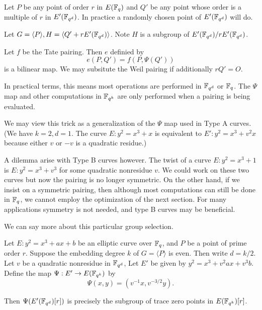 Let $P$ be any point of order $r$ in $E(\mathbb{F}_q)$ and
$Q'$ be any point whose order is a multiple of $r$ in $E'(\mathbb{F}_{q^d})$.
In practice a randomly chosen point of $E'(\mathbb{F}_{q^d})$ will do.

Let $G = \langle P \rangle, H = \langle Q' + r E'(\mathbb{F}_{q^d}) \rangle$.
Note $H$ is a subgroup of $E'(\mathbb{F}_{q^d}) / rE'(\mathbb{F}_{q^d})$.

Let $f$ be the Tate pairing.
Then $e$ definied by
\[e(P,Q') = f(P, \Psi(Q')) \]
is a bilinear map.
We may subsitute the Weil pairing if additionally
$r Q' = O$.

In practical terms, this means most operations are performed in
$\mathbb{F}_{q^d}$  or $\mathbb{F}_q$. The $\Psi$ map and
other computations in $\mathbb{F}_{q^k}$ are only performed
when a pairing is being evaluated.

We may view this trick as a
generalization of the $\Psi$ map used in Type A curves.
(We have $k =2 , d = 1$.
The curve $E : y^2 = x^3 + x$ is equivalent to $E' : y^2 = x^3 + v^2 x$
because either $v$ or $-v$ is a quadratic residue.)

A dilemma arise with Type B curves however. The twist
of a curve $E : y^2 = x^3 + 1 $ is $E: y^2 = x^3 + v^3 $ for some
quadratic nonresidue $v$. We could work on these two curves but now
the pairing is no longer symmetric. On the other hand, if we insist on
a symmetric pairing, then although most computations can still be done
in $\mathbb{F}_q$, we cannot employ the optimization of the next section. For
many applications symmetry is not needed, and type B curves may be beneficial.

We can say more about this particular group selection.

\begin{theorem}
Let $E : y^2 = x^3 + a x + b$ be an elliptic curve over $\mathbb{F}_q$,
and $P$ be a point of prime order $r$.
Suppose the embedding degree $k$ of $G = \langle P \rangle$ is even.
Then write $d = k / 2$. Let $v$ be a quadratic nonresidue in $\mathbb{F}_{q^d}$,
Let $E'$ be given by $y^2 = x^3 + v^2 a x + v^3 b$.
Define the map $\Psi:E'\rightarrow E(\mathbb{F}_{q^k})$ by
\[ \Psi(x,y) = (v^{-1}x, v^{-3/2}y) . \]

Then $\Psi(E'(\mathbb{F}_{q^d})[r])$ is precisely the subgroup of trace zero points
in $E(\mathbb{F}_{q^k})[r]$.
\end{theorem}

